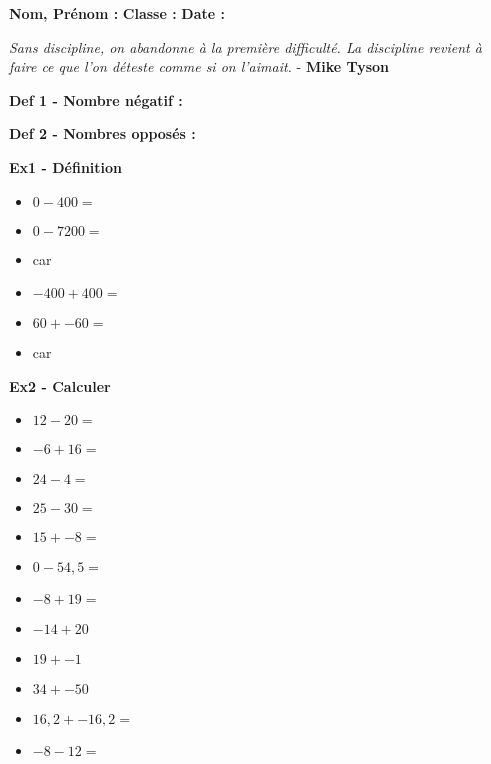 



\textbf{Nom, Prénom :} \hspace{8cm} \textbf{Classe :} \hspace{3cm} \textbf{Date :}\\

\vspace{-0.3cm}

\begin{center}
  \textit{Sans discipline, on abandonne à la première difficulté. La discipline revient à faire ce que l'on déteste comme si on l'aimait.} - \textbf{Mike Tyson}
\end{center}

\textbf{Def 1 - Nombre négatif :}  \dotfill \\ \Pointilles[1]

\textbf{Def 2 - Nombres opposés :} \dotfill \\ \Pointilles[1]

\textbf{Ex1 - Définition}

\begin{multicols}{2}
  \begin{itemize}[label={$\bullet$}]
    \item $0 - 400 = $  \dotfill
    \item $0 - 7200 = $ \dotfill
    \item car \dotfill \columnbreak
    \item $-400 + 400 = $  \dotfill
    \item $60 + -60 = $ \dotfill
    \item car \dotfill \columnbreak
  \end{itemize} 
  \end{multicols}

\textbf{Ex2 - Calculer}

\begin{multicols}{3}
\begin{itemize}[label={$\bullet$}]
  \item $12 - 20 = $ \dotfill
  \item $-6 + 16 = $ \dotfill
  \item $24 - 4 = $ \dotfill
  \item $25 - 30 = $ \dotfill \columnbreak
  \item $15 + -8 = $ \dotfill
  \item $0 - 54,5 = $ \dotfill
  \item $-8 + 19 = $ \dotfill
  \item $-14 + 20$ \dotfill \columnbreak
  \item $19 + -1$ \dotfill
  \item $34 + -50$ \dotfill
  \item $16,2 + - 16,2 = $ \dotfill
  \item $-8 - 12 = $ \dotfill
\end{itemize} 
\end{multicols}


